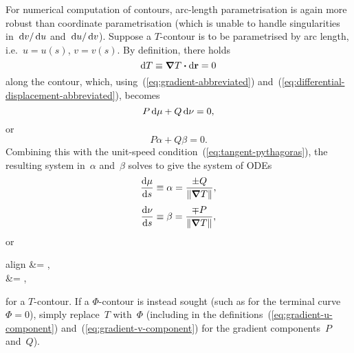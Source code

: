 For numerical computation of contours,
arc-length parametrisation is again more robust
than coordinate parametrisation
(which is unable to handle singularities
in~$\mathop{}\!\mathrm{d} v / \mathop{}\!\mathrm{d} u$ and~$\mathop{}\!\mathrm{d} u / \mathop{}\!\mathrm{d} v$).
Suppose a $T$-contour is to be parametrised by arc length,
i.e.~$u = u (s)$, $v = v(s)$.
By definition, there holds
\[
  \mathop{}\!\mathrm{d} T \equiv \mathop{}\!\boldsymbol{\mathrm{\nabla}} T \boldsymbol{\cdot} \mathop{}\!\mathrm{d} \boldsymbol{\mathrm{r}} = 0
\]
along the contour,
which, using~(\ref{eq:gradient-abbreviated})
and~(\ref{eq:differential-displacement-abbreviated}),
becomes
\[
  P \mathop{}\!\mathrm{d} \mu + Q \mathop{}\!\mathrm{d} \nu = 0,
\]
or
\begin{equation}
  P \alpha + Q \beta = 0.
  \label{eq:contour-arc-length-parametrisation-contour}
\end{equation}
Combining this with the unit-speed condition~(\ref{eq:tangent-pythagoras}),
the resulting system in~$\alpha$ and~$\beta$
solves to give the system of ODEs
\begin{align}
  \tder{\mu}{s} &\defeq \alpha = \frac{\pm Q}{\norm{\del T}},
    \label{eq:contour-ode-arc-length-parametrisation-mu} \\[\fraclinespace]
  \tder{\nu}{s} &\defeq \beta = \frac{\mp P}{\norm{\del T}}
    \label{eq:contour-ode-arc-length-parametrisation-nu},
\end{align}
or
\begin{important}{align}
   &= ,
    \label{eq:contour-ode-arc-length-parametrisation-u} \\[\fraclinespace]
   &= 
    \label{eq:contour-ode-arc-length-parametrisation-v},
\end{important}
for a $T$-contour.
If a $\Phi$-contour is instead sought
(such as for the terminal curve~$\Phi = 0$),
simply replace~$T$ with~$\Phi$
(including in the definitions~(\ref{eq:gradient-u-component})
and~(\ref{eq:gradient-v-component})
for the gradient components~$P$ and~$Q$).
